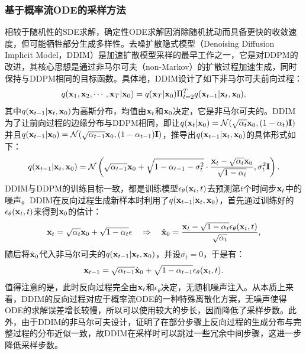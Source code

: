 \documentclass[11pt,a4paper,UTF8]{ctexart}
\begin{document}
\subsubsection{基于概率流ODE的采样方法}

相较于随机性的SDE求解，确定性ODE求解因消除随机扰动而具备更快的收敛速度，但可能牺牲部分生成多样性。去噪扩散隐式模型（Denoising Diffusion Implicit Model，DDIM）\cite{song2020denoising}是加速扩散模型采样的最早工作之一，它是对DDPM的改进，其核心思想是通过非马尔可夫（non-Markov）的扩散过程加速生成，同时保持与DDPM相同的目标函数。具体地，DDIM设计了如下非马尔可夫前向过程：
\begin{equation*}
    q(\mathbf{x}_1,\mathbf{x}_2,\cdots,\mathbf{x}_T|\mathbf{x}_0)=q(\mathbf{x}_T|\mathbf{x}_0)\Pi_{t=2}^T q(\mathbf{x}_{t-1}|\mathbf{x}_t,\mathbf{x}_0),
\end{equation*}
其中$q(\mathbf{x}_{t-1}|\mathbf{x}_t,\mathbf{x}_0)$为高斯分布，均值由$\mathbf{x}_t$和$\mathbf{x}_0$决定，它是非马尔可夫的。DDIM为了让前向过程的边缘分布与DDPM相同，即让$q(\mathbf{x}_t|\mathbf{x}_0)=\mathcal{N}(\sqrt{\alpha_t}\mathbf{x}_0,(1-\alpha_t)\mathbf{I})$并且$q(\mathbf{x}_{t-1}|\mathbf{x}_0)=\mathcal{N}(\sqrt{\alpha_{t-1}}\mathbf{x}_0,(1-\alpha_{t-1})\mathbf{I})$，推导出$q(\mathbf{x}_{t-1}|\mathbf{x}_t,\mathbf{x}_0)$的具体形式如下：
\begin{equation*}
    q(\mathbf{x}_{t-1}|\mathbf{x}_t,\mathbf{x}_0) = \mathcal{N}\left(\sqrt{\alpha_{t-1}}\mathbf{x}_0 + \sqrt{1-\alpha_{t-1}-\sigma_t^2}\cdot\frac{\mathbf{x}_t-\sqrt{\alpha_t}\mathbf{x}_0}{\sqrt{1-\alpha_t}},\sigma_t^2\mathbf{I} \right).
\end{equation*}
DDIM与DDPM的训练目标一致，都是训练模型$\epsilon_\theta(\mathbf{x}_t,t)$去预测第$t$个时间步$\mathbf{x}_t$中的噪声。DDIM在反向过程生成新样本时利用了$q(\mathbf{x}_{t-1}|\mathbf{x}_t,\mathbf{x}_0)$，首先通过训练好的$\epsilon_\theta(\mathbf{x}_t,t)$来得到$\mathbf{x}_0$的估计：
\begin{equation*}
    \mathbf{x}_t = \sqrt{\alpha_t}\mathbf{x}_0 + \sqrt{1-\alpha_t}\epsilon\quad \Rightarrow\quad \hat{\mathbf{x}}_0 = \frac{\mathbf{x}_t - \sqrt{1-\alpha_t}\epsilon_\theta(\mathbf{x}_t,t)}{\sqrt{\alpha_t}},
\end{equation*}
随后将$\hat{\mathbf{x}}_0$代入非马尔可夫的$q(\mathbf{x}_{t-1}|\mathbf{x}_t,\mathbf{x}_0)$，并设$\sigma_t=0$，于是有：
\begin{equation*}
    \mathbf{x}_{t-1}=\sqrt{\alpha_{t-1}} \hat{\mathbf{x}}_0 + \sqrt{1-\alpha_{t-1}}\epsilon_\theta(\mathbf{x}_t,t).
\end{equation*}
值得注意的是，此时反向过程完全由$\mathbf{x}_t$和$\epsilon_\theta$决定，无随机噪声注入。从本质上来看，DDIM的反向过程对应于概率流ODE的一种特殊离散化方案，无噪声使得ODE的求解误差增长较慢，所以可以使用较大的步长，因而降低了采样步数。此外，由于DDIM的非马尔可夫设计，\cite{song2020denoising}证明了在部分步骤上反向过程的生成分布与完整过程的分布近似一致，故DDIM在采样时可以跳过一些冗余中间步骤，这进一步降低采样步数。
\end{document}
